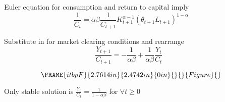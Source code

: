 \documentclass[notes=show]{beamer}
\begin{document}
\begin{frame}%


Euler equation for consumption and return to capital imply%
\begin{equation*}
\frac{1}{C_{t}}=\alpha \beta \frac{1}{C_{t+1}}K_{t+1}^{\alpha -1}\left(
\theta _{t+1}L_{t+1}\right) ^{1-\alpha }
\end{equation*}

Substitute in for market clearing conditions and rearrange%
\begin{equation*}
\frac{Y_{t+1}}{C_{t+1}}=-\frac{1}{\alpha \beta }+\frac{1}{\alpha \beta }%
\frac{Y_{t}}{C_{t}}\text{ }
\end{equation*}

\transboxout%
\end{frame}%

\begin{frame}%

%
\begin{equation*}
\FRAME{itbpF}{2.7614in}{2.4742in}{0in}{}{}{Figure}{\special{language
"Scientific Word";type "GRAPHIC";maintain-aspect-ratio TRUE;display
"USEDEF";valid_file "T";width 2.7614in;height 2.4742in;depth
0in;original-width 9.1108in;original-height 8.1526in;cropleft "0";croptop
"1";cropright "1";cropbottom "0";tempfilename
'PF6ZJM0H.bmp';tempfile-properties "XPR";}}
\end{equation*}

\begin{center}
Only stable solution is $\frac{Y_{t}}{C_{t}}=\frac{1}{1-\alpha \beta }$ for $%
\forall t\geq 0$
\end{center}

\transboxout%
\end{frame}%
\end{document}
